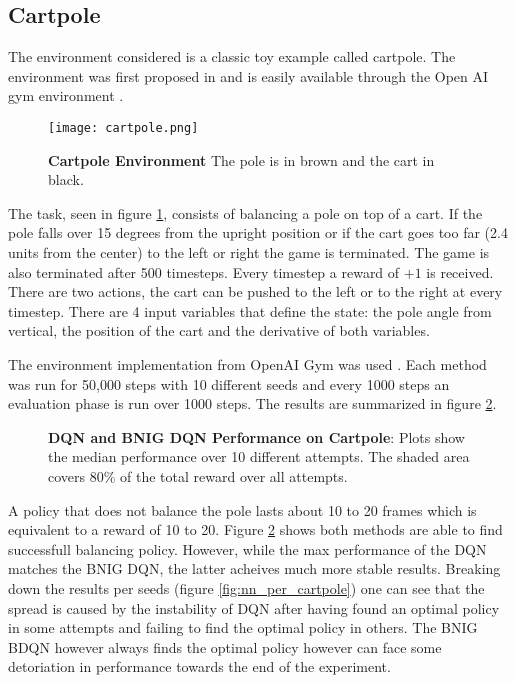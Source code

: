 \subsection{Cartpole}

The environment considered is a classic toy example called cartpole. The environment was first proposed in \cite{barto_sutton_1983} and is easily available through the Open AI gym environment \citep{brockman_2016}.

\begin{figure}[H]
    \centering
    \texttt{[image: cartpole.png]}
    \caption{\textbf{Cartpole Environment} The pole is in brown and the cart in black. \citep{gym_docs}}
    \label{fig:cartpole}
\end{figure}

The task, seen in figure \ref{fig:cartpole}, consists of balancing a pole on top of a cart. If the pole falls over 15 degrees from the upright position or if the cart goes too far (2.4 units from the center) to the left or right the game is terminated. The game is also terminated after 500 timesteps. Every timestep a reward of $+1$ is received. There are two actions, the cart can be pushed to the left or to the right at every timestep. There are 4 input variables that define the state: the pole angle from vertical, the position of the cart and the derivative of both variables. 

The environment implementation from OpenAI Gym was used \citep{brockman_2016}. Each method was run for 50,000 steps with 10 different seeds and every 1000 steps an evaluation phase is run over 1000 steps. The results are summarized in figure \ref{fig:nn_cartpole}.

\begin{figure}[H]
    \centering
    \caption{\textbf{DQN and BNIG DQN Performance on Cartpole}: Plots show the median performance over 10 different attempts. The shaded area covers 80\% of the total reward over all attempts.}
    \label{fig:nn_cartpole}
\end{figure}

A policy that does not balance the pole lasts about 10 to 20 frames which is equivalent to a reward of 10 to 20. Figure \ref{fig:nn_cartpole} shows both methods are able to find successfull balancing policy. However, while the max performance of the DQN matches the BNIG DQN, the latter acheives much more stable results. Breaking down the results per seeds (figure \ref{fig:nn_per_cartpole}) one can see that the spread is caused by the instability of DQN after having found an optimal policy in some attempts and failing to find the optimal policy in others. The BNIG BDQN however always finds the optimal policy however can face some detoriation in performance towards the end of the experiment. 

